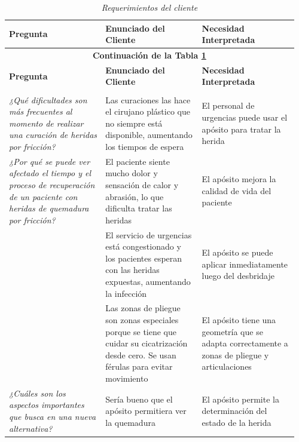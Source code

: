 \documentclass[../../DocumentoCompleto.tex]{subfiles}
\begin{document}
\begin{longtable}{p{0.32\linewidth} p{0.32\linewidth} p{0.32\linewidth}}
\caption{\textit{Requerimientos del cliente}} \label{tab:requerimientos_cliente} \\

\toprule
\textbf{Pregunta} & \textbf{Enunciado del Cliente} & \textbf{Necesidad Interpretada} \\ 
\midrule
\endfirsthead

\multicolumn{3}{c}{{\bfseries Continuación de la Tabla \ref{tab:requerimientos_cliente}}} \\ \toprule
\textbf{Pregunta} & \textbf{Enunciado del Cliente} & \textbf{Necesidad Interpretada} \\ 
\midrule
\endhead

\midrule
\multicolumn{3}{r}{{}} \\
\endfoot

\bottomrule
\endlastfoot

\textit{¿Qué dificultades son más frecuentes al momento de realizar una curación de heridas por fricción?} 
& Las curaciones las hace el cirujano plástico que no siempre está disponible, aumentando los tiempos de espera 
& El personal de urgencias puede usar el apósito para tratar la herida \\

\midrule
\textit{¿Por qué se puede ver afectado el tiempo y el proceso de recuperación de un paciente con heridas de quemadura por fricción?} 
& El paciente siente mucho dolor y sensación de calor y abrasión, lo que dificulta tratar las heridas 
& El apósito mejora la calidad de vida del paciente \\

& El servicio de urgencias está congestionado y los pacientes esperan con las heridas expuestas, aumentando la infección 
& El apósito se puede aplicar inmediatamente luego del desbridaje \\

& Las zonas de pliegue son zonas especiales porque se tiene que cuidar su cicatrización desde cero. Se usan férulas para evitar movimiento 
& El apósito tiene una geometría que se adapta correctamente a zonas de pliegue y articulaciones \\

\midrule
\textit{¿Cuáles son los aspectos importantes que busca en una nueva alternativa?}
& Sería bueno que el apósito permitiera ver la quemadura 
& El apósito permite la determinación del estado de la herida \\


\end{longtable}
\end{document}

